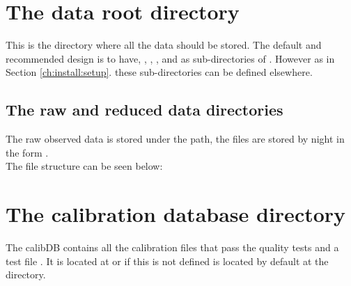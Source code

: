 \clearpage
\newpage
\section{The data root directory}
\label{ch:data_architecture:data_root_folder}

This is the directory where all the data should be stored. The default and recommended design is to have, , , , and  as sub-directories of . However as in Section \ref{ch:install:setup}. these sub-directories can be defined elsewhere.

\subsection{The raw and reduced data directories}
\label{ch:data_architecture:data_root_folderraw_folder}
The raw observed data is stored under the  path, the files are stored by night in the form \constantFolderDateFormat. \\

\noindent The file structure can be seen below:
\begin{tcustomdir}
\end{tcustomdir}

\clearpage
\newpage
\section{The calibration database directory}
\label{ch:data_architecture:calibDB}
\begin{tcustomdir}
\end{tcustomdir}
\noindent The calibDB contains all the calibration files that pass the quality tests and a test file \masterCALIBDBfile. It is located at  or if this is not defined is located by default at the  directory.

